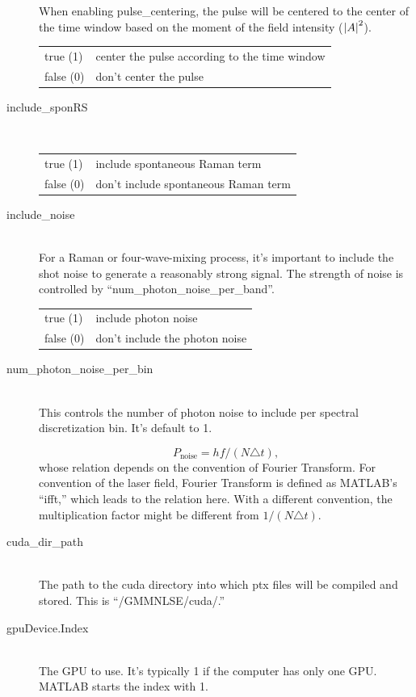 \documentclass[12pt,hidelinks]{book}
\begin{document}
\begin{description}
When enabling pulse\_centering, the pulse will be centered to the center of the time window based on the moment of the field intensity ($\abs{A}^2$).

\begin{tabular}{ll}
true (1) & center the pulse according to the time window \\
false (0) & don't center the pulse
\end{tabular}

\item[\color{blue}include\_sponRS]\mbox{}\\
\begin{tabular}{ll}
true (1) & include spontaneous Raman term \\
false (0) & don't include spontaneous Raman term
\end{tabular}

\item[\color{blue}include\_noise]\mbox{}\\
For a Raman or four-wave-mixing process, it's important to include the shot noise to generate a reasonably strong signal. The strength of noise is controlled by ``num\_photon\_noise\_per\_band''.

\begin{tabular}{ll}
true (1) & include photon noise \\
false (0) & don't include the photon noise
\end{tabular}

\item[\color{blue}num\_photon\_noise\_per\_bin]\mbox{}\\
This controls the number of photon noise to include per spectral discretization bin. It's default to \num{1}.

\begin{equation}
P_{\text{noise}}=hf/\left(N\triangle t\right),
\end{equation}
whose relation depends on the convention of Fourier Transform. For convention of the laser field, Fourier Transform is defined as MATLAB's ``ifft,'' which leads to the relation here. With a different convention, the multiplication factor might be different from $1/\left(N\triangle t\right)$.

\item[\color{blue}cuda\_dir\_path]\mbox{}\\
The path to the cuda directory into which ptx files will be compiled and stored. This is ``/GMMNLSE/cuda/.''

\item[gpuDevice.Index]\mbox{}\\
The GPU to use. It's typically 1 if the computer has only one GPU. MATLAB starts the index with 1.
\end{description}
\end{document}
